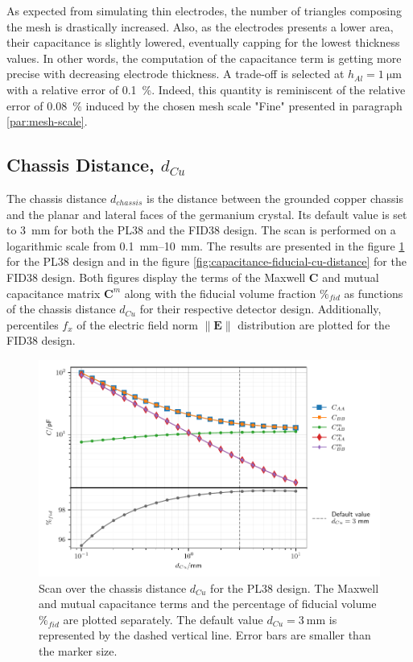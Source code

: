 As expected from simulating thin electrodes, the number of triangles composing the mesh is drastically increased. Also, as the electrodes presents a lower area, their capacitance is slightly lowered, eventually capping for the lowest thickness values. In other words, the computation of the capacitance term is getting more precise with decreasing electrode thickness. A trade-off is selected at $h_{Al}=\SI{1}{\micro\meter}$ with a relative error of \SI{0.1}{\percent}. Indeed, this quantity is reminiscent of the relative error of \SI{0.08}{\percent} induced by the chosen mesh scale "Fine" presented in paragraph \ref{par:mesh-scale}.


\subsection{Chassis Distance, $d_{Cu}$}

The chassis distance $d_{chassis}$ is the distance between the grounded copper chassis and the planar and lateral faces of the germanium crystal. Its default value is set to \SI{3}{\mm} for both the PL38 and the FID38 design. The scan is performed on a logarithmic scale from \SIrange{0.1}{10}{\mm}. The results are presented in the figure \ref{fig:capacitance-fiducial-cu-distance-pl38} for the PL38 design and in the figure \ref{fig:capacitance-fiducial-cu-distance} for the FID38 design. Both figures display the terms of the Maxwell $\bm{C}$ and mutual capacitance matrix $\bm{C}^m$ along with the fiducial volume fraction $\%_{fid}$ as functions of the chassis distance $d_{Cu}$ for their respective detector design. Additionally, percentiles $f_x$ of the electric field norm $\| \mathbf{E} \|$ distribution are plotted for the FID38 design.

\begin{figure}
\centering
\includegraphics[scale=1]{Figures/ElectrodesScan/capacitance_fiducial_cu_distance_pl38.pdf}
\caption{Scan over the chassis distance $d_{Cu}$ for the PL38 design. The Maxwell and mutual capacitance terms and the percentage of fiducial volume $\%_{fid}$ are plotted separately. The default value $d_{Cu}=\SI{3}{\mm}$ is represented by the dashed vertical line. Error bars are smaller than the marker size.}
\label{fig:capacitance-fiducial-cu-distance-pl38}
\end{figure}

